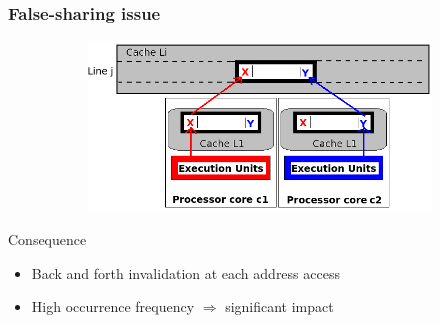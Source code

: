 \documentclass[slidestop,xcolor=dvipsnames, notes=hide]{beamer}
\begin{document}
		\begin{frame}
			\frametitle{False-sharing issue}
			\begin{figure}[!h]
				\centering
				\begin{subfigure}[b]{0.6\textwidth}
					\centering
					\includegraphics[width=\textwidth]{images/falseSharing_concecpt.png}
				\end{subfigure}
			\end{figure}

			\begin{block}{Consequence}
			\begin{itemize}
				\item Back and forth invalidation at each address access
				\item High occurrence frequency $\Rightarrow$ significant impact
			\end{itemize}
			\end{block}
		\end{frame}
\end{document}
